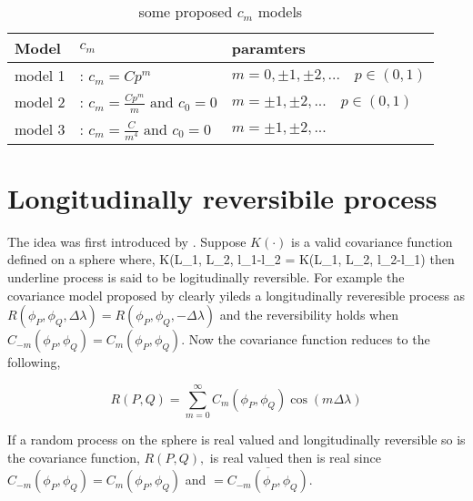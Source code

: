 		
		\begin{table}[H]
			\centering
			\begin{tabular}{l|l|l}
				\hline
				Model   & $c_m$                                            & paramters                                \\ 
				\hline \hline
				model 1 & : $c_m = Cp^m$                                & $m=0, \pm 1, \pm 2,... \quad p\in (0,1)$ \\
				model 2 & : $c_m = \frac{Cp^m}{m} \mbox{ and } c_0 = 0$ & $m=\pm 1, \pm 2,... \quad p\in (0,1)$    \\
				model 3 & : $c_m = \frac{C}{m^4} \mbox{ and } c_0 = 0$  & $m=\pm 1, \pm 2,...$                     \\
				\hline
			\end{tabular}
			\caption{some proposed $c_m$ models}
		\end{table}
			
		\section{Longitudinally reversibile process}
			
		The idea was first introduced by \cite{Stein2007}. Suppose $K(\cdot)$ is a valid covariance function defined on a sphere where,
		\beq
		K(L_1, L_2, l_1-l_2 = K(L_1, L_2, l_2-l_1)
		\eeq
then underline process is said to be logitudinally reversible. For example the covariance model proposed by \cite{Huang2012} clearly yileds a longitudinally reveresible process as $R(\phi_P, \phi_Q, \Delta\lambda) = R(\phi_P, \phi_Q, -\Delta\lambda)$ and the reversibility holds when $C_{-m}(\phi_P,\phi_Q)=C_m(\phi_P,\phi_Q)$. Now the covariance function reduces to the following,  

\[
R(P,Q) = \sum_{m=0}^{\infty} C_m(\phi_P,\phi_Q)\cos(m\Delta\lambda)
\]

If a random process on the sphere is real valued and longitudinally reversible so is the covariance function, $R(P,Q),$ is real valued then \Cm is real since $C_{-m}(\phi_P,\phi_Q)=C_m(\phi_P,\phi_Q)$  and \Cm $= \overline{C_{-m}(\phi_P,\phi_Q)}$.   

			
			
			
			

